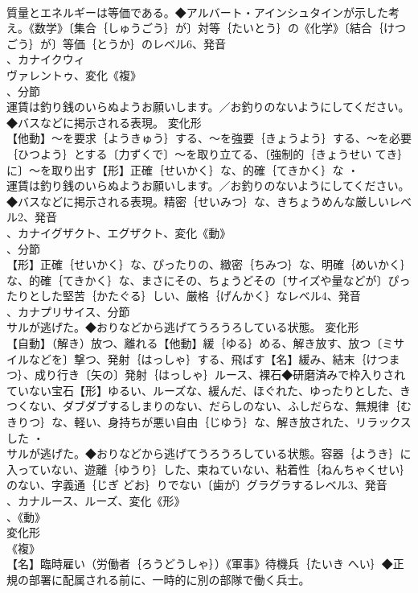 \documentclass[8pt]{extreport}
\begin{document}
\begin{CJK}{UTF8}{min}
\\	質量とエネルギーは等価である。◆アルバート・アインシュタインが示した考え。《数学》〔集合｛しゅうごう｝が〕対等｛たいとう｝の《化学》〔結合｛けつごう｝が〕等価｛とうか｝のレベル6、発音
\\	、カナイクウィ
\\	ヴァレントゥ、変化《複》
\\	、分節
\\	運賃は釣り銭のいらぬようお願いします。／お釣りのないようにしてください。◆バスなどに掲示される表現。	変化形 
\\	【他動】～を要求｛ようきゅう｝する、～を強要｛きょうよう｝する、～を必要｛ひつよう｝とする〔力ずくで〕～を取り立てる、〔強制的｛きょうせい てき｝に〕～を取り出す【形】正確｛せいかく｝な、的確｛てきかく｝な ・
\\	運賃は釣り銭のいらぬようお願いします。／お釣りのないようにしてください。◆バスなどに掲示される表現。精密｛せいみつ｝な、きちょうめんな厳しいレベル2、発音
\\	、カナイグザクト、エグザクト、変化《動》
\\	、分節
\\	【形】正確｛せいかく｝な、ぴったりの、緻密｛ちみつ｝な、明確｛めいかく｝な、的確｛てきかく｝な、まさにその、ちょうどその〔サイズや量などが〕ぴったりとした堅苦｛かたぐる｝しい、厳格｛げんかく｝なレベル4、発音
\\	、カナプリサイス、分節
\\	サルが逃げた。◆おりなどから逃げてうろうろしている状態。	変化形 
\\	【自動】（解き）放つ、離れる【他動】緩｛ゆる｝める、解き放す、放つ〔ミサイルなどを〕撃つ、発射｛はっしゃ｝する、飛ばす【名】緩み、結末｛けつまつ｝、成り行き〔矢の〕発射｛はっしゃ｝ルース、裸石◆研磨済みで枠入りされていない宝石【形】ゆるい、ルーズな、緩んだ、ほぐれた、ゆったりとした、きつくない、ダブダブするしまりのない、だらしのない、ふしだらな、無規律｛むきりつ｝な、軽い、身持ちが悪い自由｛じゆう｝な、解き放された、リラックスした ・
\\	サルが逃げた。◆おりなどから逃げてうろうろしている状態。容器｛ようき｝に入っていない、遊離｛ゆうり｝した、束ねていない、粘着性｛ねんちゃくせい｝のない、字義通｛じぎ どお｝りでない〔歯が〕グラグラするレベル3、発音
\\	、カナルース、ルーズ、変化《形》
\\	、《動》
\\	変化形 
\\	《複》
\\	【名】臨時雇い（労働者｛ろうどうしゃ｝）《軍事》待機兵｛たいき へい｝◆正規の部署に配属される前に、一時的に別の部隊で働く兵士。

\end{CJK}
\end{document}
